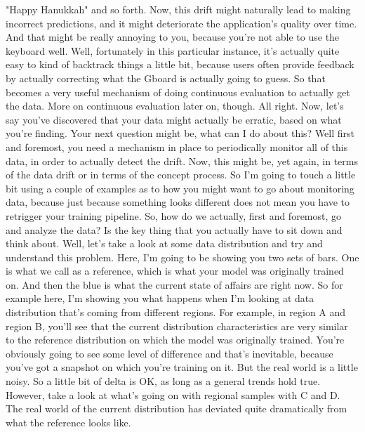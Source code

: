 {{{{{{{{    "Happy Hanukkah" and so forth.
    Now, this drift might naturally lead to making incorrect predictions,
    and it might deteriorate the application's quality over time.
    And that might be really annoying to you,
    because you're not able to use the keyboard well.
    Well, fortunately in this particular instance,
    it's actually quite easy to kind of backtrack things a little bit,
    because users often provide feedback by actually correcting what
    the Gboard is actually going to guess.
    So that becomes a very useful mechanism of doing continuous evaluation
    to actually get the data.
    More on continuous evaluation later on, though.
    All right.
    Now, let's say you've discovered that your data might actually be erratic,
    based on what you're finding.
    Your next question might be, what can I do about this?
    Well first and foremost, you need a mechanism in place
    to periodically monitor all of this data,
    in order to actually detect the drift.
    Now, this might be, yet again, in terms of the data drift
    or in terms of the concept process.
    So I'm going to touch a little bit using a couple of examples
    as to how you might want to go about monitoring data,
    because just because something looks different
    does not mean you have to retrigger your training pipeline.
    So, how do we actually, first and foremost, go and analyze the data?
    Is the key thing that you actually have to sit down and think about.
    Well, let's take a look at some data distribution
    and try and understand this problem.
    Here, I'm going to be showing you two sets of bars.
    One is what we call as a reference, which is what your model was originally
    trained on.
    And then the blue is what the current state of affairs are right now.
    So for example here, I'm showing you what
    happens when I'm looking at data distribution that's
    coming from different regions.
    For example, in region A and region B, you'll
    see that the current distribution characteristics
    are very similar to the reference distribution on which the model was
    originally trained.
    You're obviously going to see some level of difference
    and that's inevitable, because you've got a snapshot on which you're
    training on it.
    But the real world is a little noisy.
    So a little bit of delta is OK, as long as a general trends hold true.
    However, take a look at what's going on with regional samples with C and D.
    The real world of the current distribution has
    deviated quite dramatically from what the reference looks like.
}}}}}}}}
